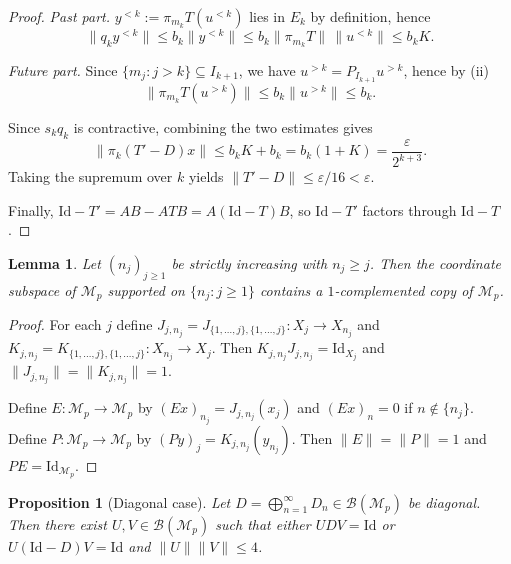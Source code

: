 \documentclass[11pt]{amsart}
\theoremstyle{plain}
\newtheorem{lemma}[theorem]{Lemma}
\newtheorem{proposition}[theorem]{Proposition}
\theoremstyle{definition}
\numberwithin{equation}{section}
\newcommand{\norm}[1]{\lVert #1 \rVert}
\newcommand{\Bop}{\mathcal{B}}
\newcommand{\Id}{\mathrm{Id}}
\renewcommand{\le}{\leqslant}
\renewcommand{\ge}{\geqslant}
\begin{document}
\begin{proof}
\smallskip\noindent
\emph{Past part.} $y^{<k}:=\pi_{m_k}T(u^{<k})$ lies in $E_k$ by definition, hence
\[
\norm{q_k y^{<k}}\le b_k\norm{y^{<k}}\le b_k \norm{\pi_{m_k}T}\,\norm{u^{<k}}\le b_k K.
\]

\smallskip\noindent
\emph{Future part.} Since $\{m_j:j>k\}\subseteq I_{k+1}$, we have $u^{>k}=P_{I_{k+1}}u^{>k}$, hence by (ii)
\[
\norm{\pi_{m_k}T(u^{>k})}\le b_k\norm{u^{>k}}\le b_k.
\]

Since $s_k q_k$ is contractive, combining the two estimates gives
\[
\norm{\pi_k(T'-D)x}\le b_kK+b_k=b_k(1+K)=\frac{\varepsilon}{2^{k+3}}.
\]
Taking the supremum over $k$ yields $\norm{T'-D}\le \varepsilon/16<\varepsilon$.

Finally, $\Id-T' = AB-ATB = A(\Id-T)B$, so $\Id-T'$ factors through $\Id-T$.
\end{proof}


\begin{lemma}\label{lem:subsequence-copy}
Let $(n_j)_{j\ge 1}$ be strictly increasing with $n_j\ge j$.
Then the coordinate subspace of $\mathcal{M}_p$ supported on $\{n_j:j\ge 1\}$ contains a $1$-complemented copy of $\mathcal{M}_p$.
\end{lemma}

\begin{proof}
For each $j$ define $J_{j,n_j}=J_{\{1,\dots,j\},\{1,\dots,j\}}\colon X_j\to X_{n_j}$ and
$K_{j,n_j}=K_{\{1,\dots,j\},\{1,\dots,j\}}\colon X_{n_j}\to X_j$.
Then $K_{j,n_j}J_{j,n_j}=\Id_{X_j}$ and $\norm{J_{j,n_j}}=\norm{K_{j,n_j}}=1$.

Define $E\colon \mathcal{M}_p\to\mathcal{M}_p$ by $(Ex)_{n_j}=J_{j,n_j}(x_j)$ and $(Ex)_n=0$ if $n\notin\{n_j\}$.
Define $P\colon \mathcal{M}_p\to \mathcal{M}_p$ by $(Py)_j=K_{j,n_j}(y_{n_j})$.
Then $\norm{E}=\norm{P}=1$ and $PE=\Id_{\mathcal{M}_p}$.
\end{proof}

\begin{proposition}[Diagonal case]\label{prop:diagonalPFP}
    Let $D=\bigoplus_{n=1}^\infty D_n\in\Bop(\mathcal{M}_p)$ be diagonal.
    Then there exist $U,V\in\Bop(\mathcal{M}_p)$ such that either $UDV=\Id$ or $U(\Id-D)V=\Id$ and
    $\norm{U}\norm{V}\le 4$.
\end{proposition}
\end{document}
